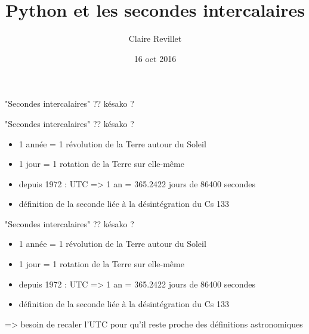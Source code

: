 \documentclass[]{beamer}
\title[Python et leapseconds]{Python et les secondes intercalaires}
\author{Claire Revillet}
\date{16 oct 2016}
\begin{document}
\frame{\titlepage}

\begin{frame}[fragile]{"Secondes intercalaires" ?? késako ?}
\end{frame}

\begin{frame}[fragile]{"Secondes intercalaires" ?? késako ?}
    \begin{center}
        \begin{itemize}
            \item 1 année = 1 révolution de la Terre autour du Soleil
            \item 1 jour = 1 rotation de la Terre sur elle-même
            \item<2-> depuis 1972 : UTC => 1 an = 365.2422 jours de 86400
                secondes
            \item<3-> définition de la seconde liée à la désintégration du Cs 133
        \end{itemize}
    \end{center}
\end{frame}

\begin{frame}[fragile]{"Secondes intercalaires" ?? késako ?}
    \begin{center}
        \begin{itemize}
            \item 1 année = 1 révolution de la Terre autour du Soleil
            \item 1 jour = 1 rotation de la Terre sur elle-même
            \item depuis 1972 : UTC => 1 an = 365.2422 jours de 86400
                secondes
            \item définition de la seconde liée à la désintégration du Cs 133
        \end{itemize}
    \end{center}
        => besoin de recaler l'UTC pour qu'il reste proche des définitions
        astronomiques
\end{frame}
\end{document}
